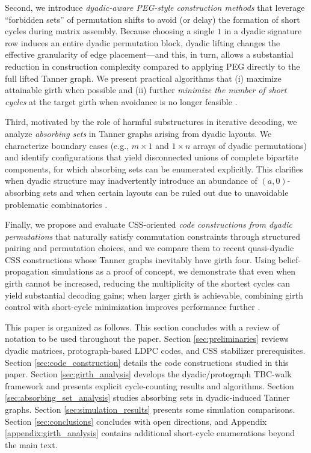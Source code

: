 \documentclass[11pt]{article}
\theoremstyle{plain}
\theoremstyle{plain}
\theoremstyle{definition}
\numberwithin{theo}{section}
\newcounter{ara}
\newcounter{rom}
\begin{document}
Second, we introduce \emph{dyadic-aware PEG-style construction methods} that leverage ``forbidden sets'' of permutation shifts to avoid (or delay) the formation of short cycles during matrix assembly. Because choosing a single $1$ in a dyadic signature row induces an entire dyadic permutation block, dyadic lifting changes the effective granularity of edge placement---and this, in turn, allows a substantial reduction in construction complexity compared to applying PEG directly to the full lifted Tanner graph. We present practical algorithms that (i) maximize attainable girth when possible and (ii) further \emph{minimize the number of short cycles} at the target girth when avoidance is no longer feasible \cite{hea05,gfsm23b}.

Third, motivated by the role of harmful substructures in iterative decoding, we analyze \emph{absorbing sets} in Tanner graphs arising from dyadic layouts. We characterize boundary cases (e.g., $m\times 1$ and $1\times n$ arrays of dyadic permutations) and identify configurations that yield disconnected unions of complete bipartite components, for which absorbing sets can be enumerated explicitly. This clarifies when dyadic structure may inadvertently introduce an abundance of $(a,0)$-absorbing sets and when certain layouts can be ruled out due to unavoidable problematic combinatorics \cite{dolecek2009analysis,mcmillon2023extremal}.

Finally, we propose and evaluate CSS-oriented \emph{code constructions from dyadic permutations} that naturally satisfy commutation constraints through structured pairing and permutation choices, and we compare them to recent quasi-dyadic CSS constructions whose Tanner graphs inevitably have girth four. Using belief-propagation simulations as a proof of concept, we demonstrate that even when girth cannot be increased, reducing the multiplicity of the shortest cycles can yield substantial decoding gains; when larger girth is achievable, combining girth control with short-cycle minimization improves performance further \cite{BBS26, kasai}.

This paper is organized as follows. This section concludes with a review of notation to be used throughout the paper. 
Section \ref{sec:preliminaries} reviews dyadic matrices, protograph-based LDPC codes, and CSS stabilizer prerequisites. Section \ref{sec:code_construction} details the code constructions studied in this paper.
Section \ref{sec:girth_analysis} develops the dyadic/protograph TBC-walk framework and presents explicit cycle-counting results and algorithms. Section \ref{sec:absorbing_set_analysis} studies absorbing sets in dyadic-induced Tanner graphs. Section \ref{sec:simulation_results} presents some simulation comparisons. Section \ref{sec:conclusions} concludes with open directions, and Appendix \ref{appendix:girth_analysis} contains additional short-cycle enumerations beyond the main text.
\\
\end{document}
